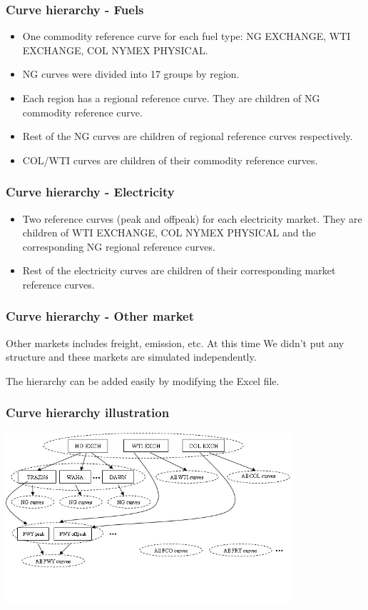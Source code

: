 \documentclass[10pt]{beamer}
\begin{document}
\frame
{
  \frametitle{Curve hierarchy - Fuels}
\begin{itemize}
\item One commodity reference curve for each fuel type:
NG EXCHANGE, WTI EXCHANGE, COL NYMEX PHYSICAL.
\item NG curves were divided into 17 groups by region.
\item Each region has a regional reference curve.
  They are children of NG commodity reference curve.
\item Rest of the NG curves are children of regional reference curves
  respectively.
\item COL/WTI curves are children of their commodity reference curves.
\end{itemize}
}


\frame
{
  \frametitle{Curve hierarchy - Electricity}
\begin{itemize}
\item Two reference curves (peak and offpeak) for each electricity market.
They are children of WTI EXCHANGE, COL NYMEX PHYSICAL and the corresponding
NG regional reference curves.
\item Rest of the electricity curves are children of their corresponding
market reference curves.
\end{itemize}
}

\frame
{
  \frametitle{Curve hierarchy - Other market}
Other markets includes freight, emission, etc. At this time 
We didn't put any structure and these markets are simulated
independently. 

The hierarchy can be added easily by modifying the Excel file.
}

\frame
{
  \frametitle{Curve hierarchy illustration}
\begin{center}
  \includegraphics[height=2.5in]{figures/pedigree.png}
\end{center}
}
\end{document}

